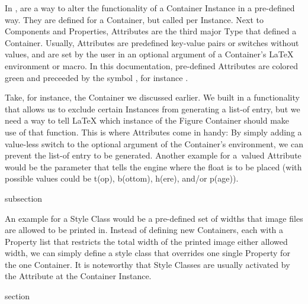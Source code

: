 In \CoCoTeX,  are a way to alter the
functionality of a Container Instance in a pre-defined way. They are
defined for a Container, but called per Instance. Next to Components
and Properties, Attributes are the third major Type that defined a
Container. Usually, Attributes are predefined key-value pairs or
switches without values, and are set by the user in an optional
argument of a Container's {\LaTeX} environment or macro. In this
documentation, pre-defined Attributes are colored green and preceeded
by the symbol \AttrSymbol, for instance .

Take, for instance, the  Container we
discussed earlier. We built in a functionality that allows us to
exclude certain Instances from generating a list-of entry, but we need
a way to tell LaTeX which instance of the Figure Container should make
use of that function. This is where Attributes come in handy: By
simply adding a value-less switch  to the optional
argument of the  Container's environment, we
can prevent the list-of entry to be generated. Another example for
a~valued Attribute would be the  parameter that
tells the engine where the float is to be placed (with possible values
could be t(op), b(ottom), h(ere), and/or p(age)).


\begin{Heading}{subsection}
\end{Heading}

An example for a Style Class would be a pre-defined set of widths that
image files are allowed to be printed in. Instead of defining new
 Containers, each with a Property list that
restricts the total width of the printed image either allowed width,
we can simply define a style class that overrides one single Property
for the one  Container. It is noteworthy that
Style Classes are usually activated by the  Attribute
at the Container Instance.






\begin{Heading}{section}
\end{Heading}

